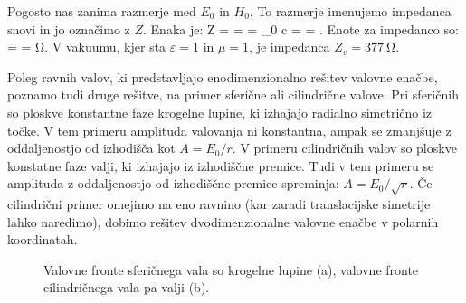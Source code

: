 Pogosto nas zanima razmerje med $E_0$ in $H_0$. To razmerje imenujemo impedanca
snovi in jo označimo z $Z$. Enaka je:
\beq
Z =  =  = \mu \mu_0 c = 
 = .
\label{eq:03_25}
\eeq
Enote za impedanco so:
\beq
{} =  = \si{\ohm}.
\label{eq:03_26}
\eeq
V vakuumu, kjer sta $\varepsilon = 1$ in $\mu= 1$, je impedanca $Z_v = 377~\si{\ohm}$.

\begin{remark}
Poleg ravnih valov, ki predstavljajo enodimenzionalno rešitev valovne enačbe, poznamo
tudi druge rešitve, na primer sferične ali cilindrične valove. Pri sferičnih so ploskve
konstantne faze krogelne lupine, ki izhajajo radialno simetrično iz točke. V tem 
primeru amplituda valovanja ni konstantna, ampak se zmanjšuje z oddaljenostjo 
od izhodišča kot $A = E_0/r$. V primeru cilindričnih valov so ploskve konstatne
faze valji, ki izhajajo iz izhodiščne premice. Tudi v tem primeru se amplituda
z oddaljenostjo od izhodiščne premice spreminja: $A = E_0/\sqrt{r}$.  Če cilindrični 
primer omejimo na eno ravnino (kar zaradi translacijske simetrije lahko naredimo), 
dobimo rešitev dvodimenzionalne valovne enačbe v polarnih koordinatah. 
\begin{figure}[ht]
\centering
\def\svgwidth{120truemm} 

\caption{Valovne fronte sferičnega vala so krogelne lupine (a), valovne fronte
cilindričnega vala pa valji (b).}
\label{fig:03_sfericnival}
\end{figure}
\end{remark}

